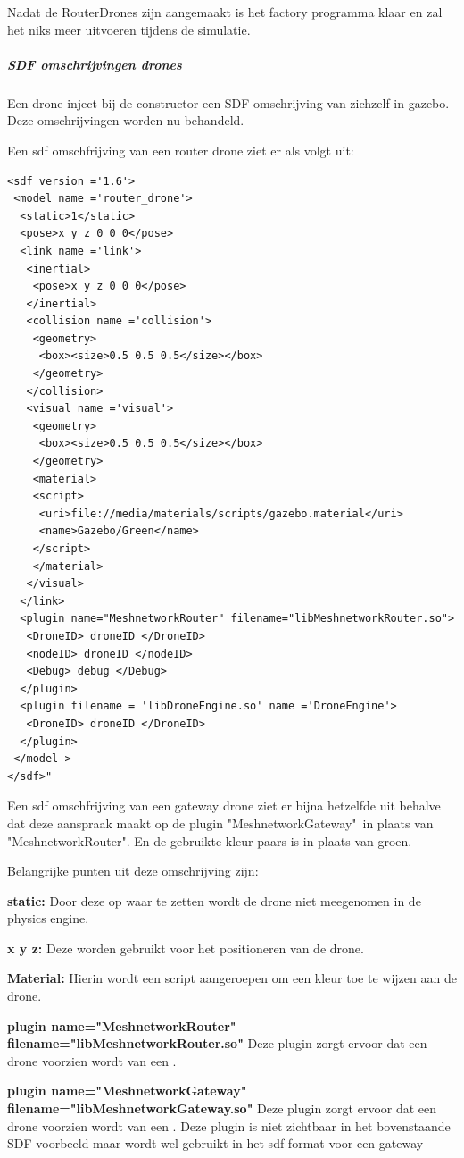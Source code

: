 \documentclass[a4paper, 11pt, oneside]{report}
\begin{document}
Nadat de RouterDrones zijn aangemaakt is het factory programma klaar en zal het niks meer uitvoeren tijdens de simulatie.

\subparagraph{SDF omschrijvingen drones}
\label{DetailedDesign:MeshNetwerk:sequence:dronefactory:droneomschrijvingen}
Een drone inject bij de constructor een SDF omschrijving van zichzelf in gazebo.
Deze omschrijvingen worden nu behandeld.

Een sdf omschfrijving van een router drone ziet er als volgt uit:
\begin{lstlisting}
<sdf version ='1.6'>
 <model name ='router_drone'>
  <static>1</static>
  <pose>x y z 0 0 0</pose>
  <link name ='link'>
   <inertial>
    <pose>x y z 0 0 0</pose>
   </inertial>
   <collision name ='collision'>
    <geometry>
     <box><size>0.5 0.5 0.5</size></box>
    </geometry>
   </collision>
   <visual name ='visual'>
    <geometry>
     <box><size>0.5 0.5 0.5</size></box>
    </geometry>
    <material>
    <script>
     <uri>file://media/materials/scripts/gazebo.material</uri>
     <name>Gazebo/Green</name>
    </script>
    </material>
   </visual>
  </link>
  <plugin name="MeshnetworkRouter" filename="libMeshnetworkRouter.so">
   <DroneID> droneID </DroneID>
   <nodeID> droneID </nodeID>
   <Debug> debug </Debug>
  </plugin>
  <plugin filename = 'libDroneEngine.so' name ='DroneEngine'>
   <DroneID> droneID </DroneID> 
  </plugin>
 </model >
</sdf>"
\end{lstlisting} 

Een sdf omschfrijving van een gateway drone ziet er bijna hetzelfde uit behalve dat deze aanspraak maakt op de plugin "MeshnetworkGateway"\ in plaats van "MeshnetworkRouter".  En de gebruikte kleur paars is in plaats van groen.

Belangrijke punten uit deze omschrijving zijn:

\textbf{static:} Door deze op waar te zetten wordt de drone niet meegenomen in de physics engine.

\textbf{x y z: } Deze worden gebruikt voor het positioneren van de drone.

\textbf{Material:} Hierin wordt een script aangeroepen om een kleur toe te wijzen aan de drone.

\textbf{plugin name="MeshnetworkRouter" filename="libMeshnetworkRouter.so"} Deze plugin zorgt ervoor dat een drone voorzien wordt van een .

\textbf{plugin name="MeshnetworkGateway" filename="libMeshnetworkGateway.so"} Deze plugin zorgt ervoor dat een drone voorzien wordt van een . Deze plugin is niet zichtbaar in het bovenstaande SDF voorbeeld maar wordt wel gebruikt in het sdf format voor een gateway 
\end{document}
